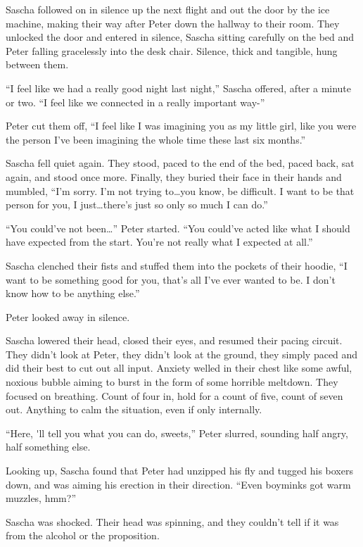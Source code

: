 \documentclass[12pt,letterpaper,oneside]{memoir}
\begin{document}
  Sascha followed on in silence up the next flight and out the door by the ice machine, making their way after Peter down the hallway to their room. They unlocked the door and entered in silence, Sascha sitting carefully on the bed and Peter falling gracelessly into the desk chair. Silence, thick and tangible, hung between them.

  ``I feel like we had a really good night last night,'' Sascha offered, after a minute or two. ``I feel like we connected in a really important way-''

  Peter cut them off, ``I feel like I was imagining you as my little girl, like you were the person I've been imagining the whole time these last six months.''

  Sascha fell quiet again. They stood, paced to the end of the bed, paced back, sat again, and stood once more. Finally, they buried their face in their hands and mumbled, ``I'm sorry. I'm not trying to\ldots{}you know, be difficult. I want to be that person for you, I just\ldots{}there's just so only so much I can do.''

  ``You could've not been\ldots{}'' Peter started. ``You could've acted like what I should have expected from the start. You're not really what I expected at all.''

  Sascha clenched their fists and stuffed them into the pockets of their hoodie, ``I want to be something good for you, that's all I've ever wanted to be. I don't know how to be anything else.''

  Peter looked away in silence.

  Sascha lowered their head, closed their eyes, and resumed their pacing circuit. They didn't look at Peter, they didn't look at the ground, they simply paced and did their best to cut out all input. Anxiety welled in their chest like some awful, noxious bubble aiming to burst in the form of some horrible meltdown. They focused on breathing. Count of four in, hold for a count of five, count of seven out. Anything to calm the situation, even if only internally.

  ``Here, \'{}ll tell you what you can do, sweets,'' Peter slurred, sounding half angry, half something else.

  Looking up, Sascha found that Peter had unzipped his fly and tugged his boxers down, and was aiming his erection in their direction. ``Even boyminks got warm muzzles, hmm?''

  Sascha was shocked. Their head was spinning, and they couldn't tell if it was from the alcohol or the proposition.
\end{document}
